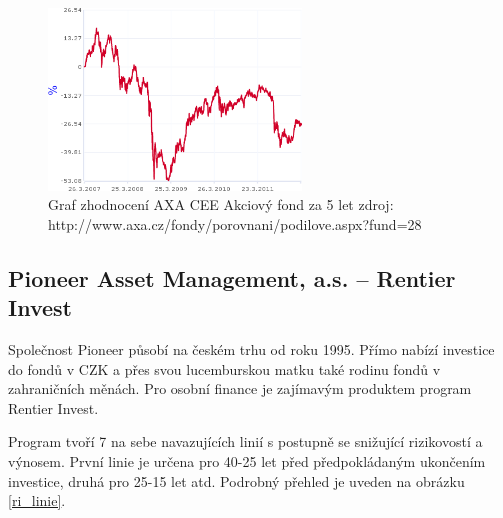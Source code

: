 \documentclass[a4paper,12pt]{article}
\begin{document}
			\begin{figure}[h!]
		  	\centering
				\includegraphics[width=0.6\textwidth]{axa_cee_akc.png}			
				\caption{Graf zhodnocení AXA CEE Akciový fond za 5 let zdroj: http://www.axa.cz/fondy/porovnani/podilove.aspx?fund=28}
				\label{axa_cee_akc}
			\end{figure}
	\subsection{Pioneer Asset Management, a.s. -- Rentier Invest}
		Společnost Pioneer působí na českém trhu od roku 1995. Přímo nabízí investice do fondů v CZK a přes svou lucemburskou matku také rodinu fondů v zahraničních měnách.\cite{pio_about} Pro osobní finance je zajímavým produktem program Rentier Invest.
		
		Program tvoří 7 na sebe navazujících linií s postupně se snižující rizikovostí a výnosem. První linie je určena pro 40-25 let před předpokládaným ukončením investice, druhá pro 25-15 let atd. Podrobný přehled je uveden na obrázku \ref{ri_linie}.
		
\end{document}
